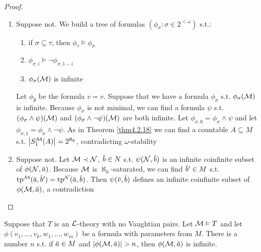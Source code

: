 \documentclass[11pt]{article}
\begin{document}
\begin{proof}
\begin{enumerate}
\item Suppose not. We build a tree of formulas \((\phi_\sigma:\sigma\in 2^{<\omega})\) s.t.:
\begin{enumerate}
\item if \(\sigma\subseteq\tau\), then \(\phi_\tau\vDash\phi_\sigma\)
\item \(\phi_{\sigma,i}\vDash\neg\phi_{\sigma,1-i}\)
\item \(\phi_\sigma(\mathcal{M})\) is infinite
\end{enumerate}
Let \(\phi_\emptyset\) be the formula \(v=v\). Suppose that we have a formula \(\phi_\sigma\) s.t. \(\phi_{\sigma}(\mathcal{M})\)
is infinite. Because \(\phi_\sigma\)  is not minimal, we can find a formula \(\psi\) s.t. \((\phi_\sigma\wedge\psi)(\mathcal{M})\)
and \((\phi_\sigma\wedge\neg\psi)(\mathcal{M})\) are both infinite. Let \(\phi_{\sigma,0}=\phi_\sigma\wedge\psi\) and let \(\phi_{\sigma,1}=\phi_\sigma\wedge\neg\psi\). As
in Theorem \ref{thm4.2.18} we can find a countable \(A\subseteq M\) s.t. \(\abs{S_1^{\calm}(A)}=2^{\aleph_0}\),
contradicting \(\omega\)-stability
\item Suppose not. Let \(\mathcal{M}\prec\mathcal{N}\), \(\barb\in N\) s.t. \(\psi(\caln,\barb)\) is an infinite coinfinite subset
of \(\phi(\caln,\bara)\). Because \(\mathcal{M}\) is \(\aleph_0\)-saturated, we can find \(\barb'\in M\)
s.t. \(\tp^{\calm}(\bara,\barb')=\tp^{\caln}(\bara,\barb)\). Then \(\psi(\barv,\barb)\) defines an
infinite coinfinite subset of \(\phi(\calm,\bara)\), a contradiction
\end{enumerate}
\end{proof}

\begin{lemma}[]
\label{lemma6.1.14}
Suppose that \(T\) is an \(\mathcal{L}\)-theory with no Vaughtian pairs. Let \(\mathcal{M}\vDash T\) and
let \(\phi(v_1,\dots,v_k,w_1,\dots,w_m)\) be a formula with parameters from \(M\). There is a number \(n\)
s.t. if \(\bara\in M\) and \(\abs{\phi(\calm,\bara)}>n\), then \(\phi(\calm,\bara)\) is infinite.
\end{lemma}
\end{document}

